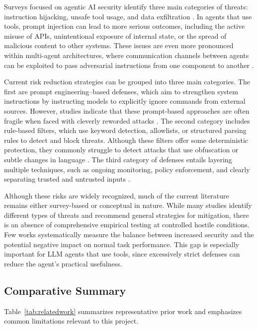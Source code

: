 \documentclass[11pt]{article}
\begin{document}
Surveys focused on agentic AI security identify three main categories of threats: instruction hijacking, unsafe tool usage, and data exfiltration \cite{deng2025agentsurvey, chhabra2026agenticsecurity}. In agents that use tools, prompt injection can lead to more serious outcomes, including the active misuse of APIs, unintentional exposure of internal state, or the spread of malicious content to other systems. These issues are even more pronounced within multi-agent architectures, where communication channels between agents can be exploited to pass adversarial instructions from one component to another \cite{schroeder2025multiagent}.

Current risk reduction strategies can be grouped into three main categories. The first are prompt engineering--based defenses, which aim to strengthen system instructions by instructing models to explicitly ignore commands from external sources. However, studies indicate that these prompt-based approaches are often fragile when faced with cleverly reworded attacks \cite{greshake2023prompt}. The second category includes rule-based filters, which use keyword detection, allowlists, or structured parsing rules to detect and block threats. Although these filters offer some deterministic protection, they commonly struggle to detect attacks that use obfuscation or subtle changes in language \cite{khan2024agenticthreats}. The third category of defenses entails layering multiple techniques, such as ongoing monitoring, policy enforcement, and clearly separating trusted and untrusted inputs \cite{chhabra2026agenticsecurity}.

Although these risks are widely recognized, much of the current literature remains either survey-based or conceptual in nature. While many studies identify different types of threats and recommend general strategies for mitigation, there is an absence of comprehensive empirical testing at controlled hostile conditions. Few works systematically measure the balance between increased security and the potential negative impact on normal task performance. This gap is especially important for LLM agents that use tools, since excessively strict defenses can reduce the agent's practical usefulness.
\subsection{Comparative Summary}

Table~\ref{tab:relatedwork} summarizes representative prior work and emphasizes common limitations relevant to this project.
\end{document}

